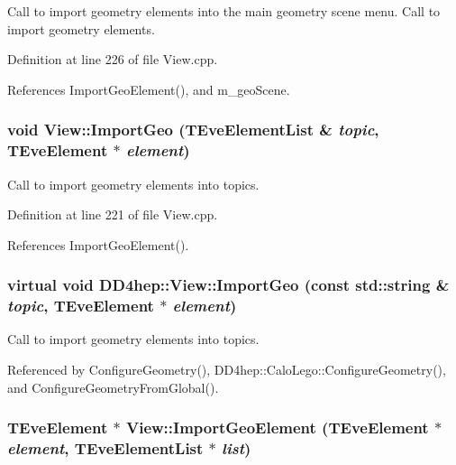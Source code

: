 Call to import geometry elements into the main geometry scene menu. Call to import geometry elements. 

Definition at line 226 of file View.cpp.

References ImportGeoElement(), and m\_\-geoScene.\hypertarget{class_d_d4hep_1_1_view_a84117a020048c8574aa7186d31f0a0ba}{
\subsubsection[{ImportGeo}]{\setlength{\rightskip}{0pt plus 5cm}void View::ImportGeo ({\bf TEveElementList} \& {\em topic}, \/  TEveElement $\ast$ {\em element})}}
\label{class_d_d4hep_1_1_view_a84117a020048c8574aa7186d31f0a0ba}


Call to import geometry elements into topics. 

Definition at line 221 of file View.cpp.

References ImportGeoElement().\hypertarget{class_d_d4hep_1_1_view_acd52a375e0d79ab3421a8026b7a14652}{
\subsubsection[{ImportGeo}]{\setlength{\rightskip}{0pt plus 5cm}virtual void DD4hep::View::ImportGeo (const std::string \& {\em topic}, \/  TEveElement $\ast$ {\em element})}}
\label{class_d_d4hep_1_1_view_acd52a375e0d79ab3421a8026b7a14652}


Call to import geometry elements into topics. 

Referenced by ConfigureGeometry(), DD4hep::CaloLego::ConfigureGeometry(), and ConfigureGeometryFromGlobal().\hypertarget{class_d_d4hep_1_1_view_adc25ba7ece97c2f7c69f8fa6e0c13088}{
\subsubsection[{ImportGeoElement}]{\setlength{\rightskip}{0pt plus 5cm}TEveElement $\ast$ View::ImportGeoElement (TEveElement $\ast$ {\em element}, \/  {\bf TEveElementList} $\ast$ {\em list})}}
\label{class_d_d4hep_1_1_view_adc25ba7ece97c2f7c69f8fa6e0c13088}


